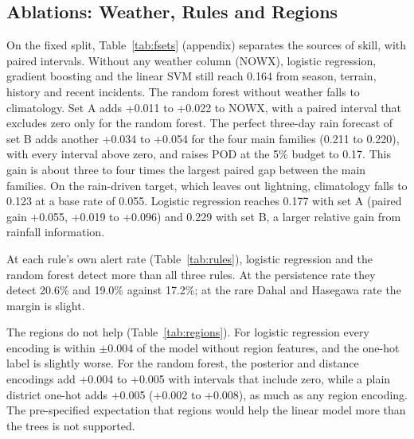 \documentclass[conference]{IEEEtran}
\begin{document}
\subsection{Ablations: Weather, Rules and Regions}
\label{sec:ablations}
On the fixed split, Table~\ref{tab:fsets} (appendix) separates the sources of skill, with paired intervals. Without any weather column (NOWX), logistic regression, gradient boosting and the linear SVM still reach 0.164 from season, terrain, history and recent incidents. The random forest without weather falls to climatology. Set A adds +0.011 to +0.022 to NOWX, with a paired interval that excludes zero only for the random forest. The perfect three-day rain forecast of set B adds another +0.034 to +0.054 for the four main families (0.211 to 0.220), with every interval above zero, and raises POD at the 5\% budget to 0.17. This gain is about three to four times the largest paired gap between the main families. On the rain-driven target, which leaves out lightning, climatology falls to 0.123 at a base rate of 0.055. Logistic regression reaches 0.177 with set A (paired gain +0.055, +0.019 to +0.096) and 0.229 with set B, a larger relative gain from rainfall information.

At each rule's own alert rate (Table~\ref{tab:rules}), logistic regression and the random forest detect more than all three rules. At the persistence rate they detect 20.6\% and 19.0\% against 17.2\%; at the rare Dahal and Hasegawa rate the margin is slight.

\begin{table}[t]
\caption{Rule baselines on test 2024 to 2025 at their own alert rate, against climatology, logistic regression and the random forest (set A, fixed split) re-thresholded to the same rate.}
\label{tab:rules}
\centering
\scriptsize
\setlength{\tabcolsep}{4pt}

\end{table}

The regions do not help (Table~\ref{tab:regions}). For logistic regression every encoding is within $\pm 0.004$ of the model without region features, and the one-hot label is slightly worse. For the random forest, the posterior and distance encodings add +0.004 to +0.005 with intervals that include zero, while a plain district one-hot adds +0.005 (+0.002 to +0.008), as much as any region encoding. The pre-specified expectation that regions would help the linear model more than the trees is not supported.

\begin{table}[t]
\caption{Objective 3: PR-AUC on test with the four location encodings added to set A (fixed split), and paired differences against the same model without them (RF: random forest; LR: logistic regression).}
\label{tab:regions}
\centering
\scriptsize

\end{table}
\end{document}
